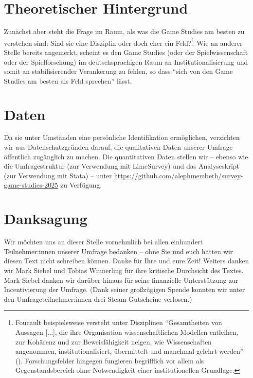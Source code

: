 \documentclass{scrartcl}
\begin{document}
\section{Theoretischer Hintergrund}\label{sec:hintergrund}
Zunächst aber steht die Frage im Raum, als was die Game Studies am besten zu verstehen sind:
Sind sie eine Disziplin oder doch eher ein Feld?\footnote{Foucault beispielsweise versteht unter Disziplinen \enquote{Gesamtheiten von Aussagen [$\ldots$], die ihre Organisation wissenschaftlichen Modellen entleihen, zur Kohärenz und zur Beweisfähigkeit neigen, wie Wissenschaften angenommen, institutionalisiert, übermittelt und manchmal gelehrt werden} (\autocite[][S.~253--254]{foucault_archaologie_2011}). Forschungsfelder hingegen fungieren begrifflich vor allem als Gegenstandsbereich ohne Notwendigkeit einer institutionellen Grundlage.}
Wie an anderer Stelle bereits angemerkt, scheint es den Game Studies (oder der Spielwissenschaft oder der Spielforschung) im deutschsprachigen Raum an Institutionalisierung und somit an stabilisierender Verankerung zu fehlen, so dass \enquote{sich von den Game Studies am besten als Feld sprechen} lässt.


\clearpage
\section*{Daten}
Da sie unter Umständen eine persönliche Identifikation ermöglichen, verzichten wir aus Datenschutzgründen darauf, die qualitativen Daten unserer Umfrage öffentlich zugänglich zu machen.
Die quantitativen Daten stellen wir -- ebenso wie die Umfragestruktur (zur Verwendung mit LimeSurvey) und das Analyseskript (zur Verwendung mit Stata) -- unter \url{https://github.com/alephmembeth/survey-game-studies-2025} zu Verfügung.


\section*{Danksagung}
Wir möchten uns an dieser Stelle vornehmlich bei allen einhundert Teilnehmer:innen unserer Umfrage bedanken -- ohne Sie und euch hätten wir diesen Text nicht schreiben können.
Danke für Ihre und eure Zeit!
Weiters danken wir Mark Siebel und Tobias Winnerling für ihre kritische Durchsicht des Textes.
Mark Siebel danken wir darüber hinaus für seine finanzielle Unterstützung zur Incentivierung der Umfrage.
(Dank seiner großzügigen Spende konnten wir unter den Umfrageteilnehmer:innen drei Steam-Gutscheine verlosen.)
\end{document}
